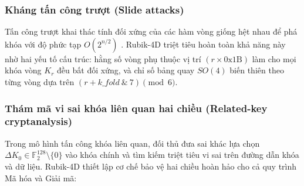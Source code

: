 \documentclass[10pt,twocolumn]{article}
\begin{document}
\subsubsection{Kháng tấn công trượt (Slide attacks)}
Tấn công trượt khai thác tính đối xứng của các hàm vòng giống hệt nhau để phá khóa với độ phức tạp $O(2^{n/2})$ \cite{biryukov1999slide, biryukov2000slide}. Rubik-4D triệt tiêu hoàn toàn khả năng này nhờ hai yếu tố cấu trúc: hằng số vòng phụ thuộc vị trí $(r \times \text{0x1B})$ làm cho mọi khóa vòng $K_r$ đều bất đối xứng, và chỉ số bảng quay $SO(4)$ biến thiên theo từng vòng dựa trên $(r + k\_fold \ \& \ 7) \pmod 6$.

\subsubsection{Thám mã vi sai khóa liên quan hai chiều (Related-key cryptanalysis)}
\label{subsec:related_key_vi}
Trong mô hình tấn công khóa liên quan, đối thủ đưa sai khác lựa chọn $\Delta K_0 \in \mathbb{F}_2^{128} \setminus \{0\}$ vào khóa chính và tìm kiếm triệt tiêu vi sai trên đường dẫn khóa và dữ liệu. Rubik-4D thiết lập cơ chế bảo vệ hai chiều hoàn hảo cho cả quy trình Mã hóa và Giải mã:
\end{document}
